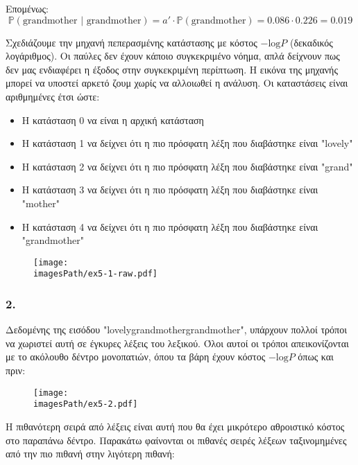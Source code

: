 \documentclass[12pt,a4paper]{article}
\newcommand{\imagesPath}{/home/nick/shmmy/8th/slp/slp-ntua/set1}
\begin{document}
			Επομένως: 
			\[
				\mathbb{P}(\text{grandmother | grandmother}) = a' \cdot \mathbb{P}(\text{grandmother}) = 0.086 \cdot 0.226 = 0.019 
			\]
			
			Σχεδιάζουμε την μηχανή πεπερασμένης κατάστασης με κόστος $-\text{log}P$ (δεκαδικός λογάριθμος). Οι παύλες δεν έχουν κάποιο συγκεκριμένο νόημα, απλά δείχνουν πως δεν μας ενδιαφέρει η έξοδος στην συγκεκριμένη περίπτωση. Η εικόνα της μηχανής μπορεί να υποστεί αρκετό ζουμ χωρίς να αλλοιωθεί η ανάλυση. Οι καταστάσεις είναι αριθμημένες έτσι ώστε:
			
			\begin{itemize}
				\item Η κατάσταση 0 να είναι η αρχική κατάσταση
				\item Η κατάσταση 1 να δείχνει ότι η πιο πρόσφατη λέξη που διαβάστηκε είναι "lovely"
				\item Η κατάσταση 2 να δείχνει ότι η πιο πρόσφατη λέξη που διαβάστηκε είναι "grand"
				\item Η κατάσταση 3 να δείχνει ότι η πιο πρόσφατη λέξη που διαβάστηκε είναι "mother"
				\item Η κατάσταση 4 να δείχνει ότι η πιο πρόσφατη λέξη που διαβάστηκε είναι "grandmother"
			\end{itemize}
			
			\begin{figure}[H]
				\begin{center}
					\texttt{[image: \\imagesPath/ex5-1-raw.pdf]}
				\end{center}
			\end{figure}
			
		
		\subsubsection*{2.} 
			Δεδομένης της εισόδου "lovelygrandmothergrandmother", υπάρχουν πολλοί τρόποι να χωριστεί αυτή σε έγκυρες λέξεις του λεξικού. Όλοι αυτοί οι τρόποι απεικονίζονται με το ακόλουθο δέντρο μονοπατιών, όπου τα βάρη έχουν κόστος $-\text{log}P$ όπως και πριν:
		
			\begin{figure}[H]
				\begin{center}
					\texttt{[image: \\imagesPath/ex5-2.pdf]}
				\end{center}
			\end{figure}
			
			Η πιθανότερη σειρά από λέξεις είναι αυτή που θα έχει μικρότερο αθροιστικό κόστος στο παραπάνω δέντρο. Παρακάτω φαίνονται οι πιθανές σειρές λέξεων ταξινομημένες από την πιο πιθανή στην λιγότερη πιθανή:
			
\end{document}

